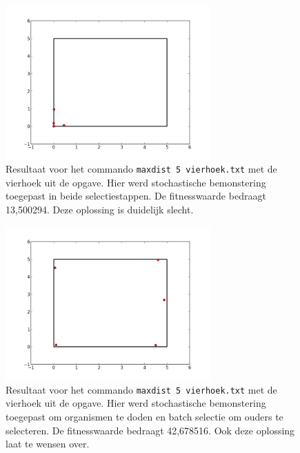 \documentclass[titlepage,a4paper]{article}
\begin{document}
\begin{appendices}
\begin{figure}[H]
\centering
\includegraphics[width=0.7\textwidth]{oplossing_5_vierhoek_both}
\caption{Resultaat voor het commando \texttt{maxdist 5 vierhoek.txt} met de vierhoek uit de opgave. Hier werd stochastische bemonstering toegepast in beide selectiestappen. De fitnesswaarde bedraagt 13,500294. Deze oplossing is duidelijk slecht.}
\label{fig:solution_5_vierhoek_uniform_both}
\end{figure}

\begin{figure}[H]
\centering
\includegraphics[width=0.7\textwidth]{oplossing_5_vierhoek_death}
\caption{Resultaat voor het commando \texttt{maxdist 5 vierhoek.txt} met de vierhoek uit de opgave. Hier werd stochastische bemonstering toegepast om organismen te doden en batch selectie om ouders te selecteren. De fitnesswaarde bedraagt 42,678516. Ook deze oplossing laat te wensen over.}
\label{fig:solution_5_vierhoek_uniform_death}
\end{figure}

\end{appendices}
\end{document}
